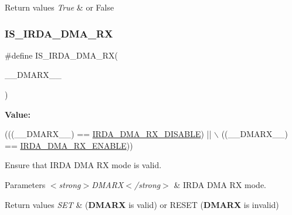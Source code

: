 \begin{DoxyRetVals}{Return values}
{\em True} & or False \\
\hline
\end{DoxyRetVals}
\mbox{\label{group___i_r_d_a___private___macros_gab7a7ec8d5f6d340bad128dbe0c25f543}} 
\subsubsection{\texorpdfstring{I\+S\+\_\+\+I\+R\+D\+A\+\_\+\+D\+M\+A\+\_\+\+RX}{IS\_IRDA\_DMA\_RX}}
{\footnotesize\ttfamily \#define I\+S\+\_\+\+I\+R\+D\+A\+\_\+\+D\+M\+A\+\_\+\+RX(\begin{DoxyParamCaption}\item[{}]{\+\_\+\+\_\+\+D\+M\+A\+R\+X\+\_\+\+\_\+ }\end{DoxyParamCaption})}

{\bfseries Value\+:}
\begin{DoxyCode}
(((\_\_DMARX\_\_) == \hyperlink{group___i_r_d_a___d_m_a___rx_ga81e25c2dd20eec53aecead5923723c0c}{IRDA\_DMA\_RX\_DISABLE}) || \(\backslash\)
                                   ((\_\_DMARX\_\_) == \hyperlink{group___i_r_d_a___d_m_a___rx_gab5de34cac5f5672f882670d7608241ed}{IRDA\_DMA\_RX\_ENABLE}))
\end{DoxyCode}


Ensure that I\+R\+DA D\+MA RX mode is valid. 


\begin{DoxyParams}{Parameters}
{\em $<$strong$>$\+D\+M\+A\+R\+X$<$/strong$>$} & I\+R\+DA D\+MA RX mode. \\
\hline
\end{DoxyParams}

\begin{DoxyRetVals}{Return values}
{\em S\+ET} & ({\bfseries D\+M\+A\+RX} is valid) or R\+E\+S\+ET ({\bfseries D\+M\+A\+RX} is invalid) \\
\hline
\end{DoxyRetVals}
\mbox{\label{group___i_r_d_a___private___macros_gae9db415403482c9cc419e61cb5277d5f}} 
